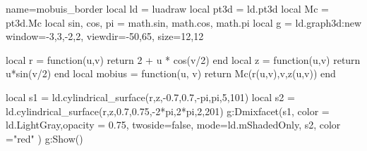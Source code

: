\documentclass{standalone}
\begin{document}
    \begin{luadraw}{name=mobuis_border}
    local ld = luadraw
    local pt3d = ld.pt3d
    local Mc = pt3d.Mc
    local sin, cos, pi = math.sin, math.cos, math.pi
    local g = ld.graph3d:new{ window={-3,3,-2,2}, viewdir={-50,65}, size={12,12} }
    
    local r = function(u,v) return 2 + u * cos(v/2) end
    local z = function(u,v) return u*sin(v/2) end
    local mobius = function(u, v)
        return Mc(r(u,v),v,z(u,v))
    end

    local s1 = ld.cylindrical_surface(r,z,-0.7,0.7,-pi,pi,{5,101})
    local s2 = ld.cylindrical_surface(r,z,0.7,0.75,-2*pi,2*pi,{2,201})
    g:Dmixfacet(s1, {color = ld.LightGray,opacity = 0.75, twoside=false, mode=ld.mShadedOnly},
        s2, {color ="red"} )
    g:Show()
\end{luadraw}
\end{document}
